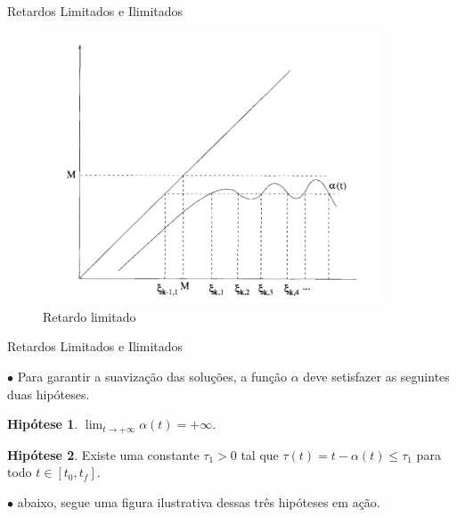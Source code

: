 \documentclass{beamer}
\theoremstyle{plain}
\theoremstyle{definition}
\newtheorem{hip}{Hipótese}
\begin{document}

\begin{frame}{Retardos Limitados e Ilimitados}

    \begin{figure}
        \begin{center}
            \includegraphics[width=0.9\textwidth, height=0.7\textheight]{retardo_limitado.png}
        \end{center}
        \caption{Retardo limitado}\label{fig:Desaparecimento do Retardo}
    \end{figure}

\end{frame}



\begin{frame}{Retardos Limitados e Ilimitados}
    
    $\bullet$ Para garantir a suavização das soluções, a função $\alpha$ deve setisfazer as seguintes duas hipóteses.

    \begin{hip}
        \label{H2:hipotese:hypothesis}
        $\lim _{t \rightarrow+\infty} \alpha(t)=+\infty$.
    \end{hip}


    \begin{hip}
        \label{H3:hipotese:hypothesis}
        Existe uma constante \(\tau_{1}>0\) tal que \(\tau(t)=t-\alpha(t) \leq \tau_{1}\) para todo \(t \in\left[t_{0}, t_{f}\right]\).
    \end{hip}

    $\bullet$ abaixo, segue uma figura ilustrativa dessas três hipóteses em ação.

\end{frame}
\end{document}
